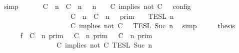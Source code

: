 \begin{isabellebody}
\ simp\isanewline
\ \ \isamarkupfalse%
\ \isamarkupfalse%
\ {\isacartoucheopen}{\isasymlbrakk}\ {\isacharparenleft}{\isacharparenleft}C\ {\isasymUp}\ n{\isacharparenright}\ {\isacharhash}\ {\isacharparenleft}C\ {\isasymnot}{\isasymUp}\ n{\isacharparenright}\ {\isacharhash}\ {\isasymGamma}{\isacharparenright}{\isacharcomma}\ n\ {\isasymturnstile}\ {\isasymPsi}\ {\isasymtriangleright}\ {\isacharparenleft}{\isacharparenleft}C\ implies\ not\ C\ {\isacharhash}\ {\isasymPhi}{\isacharparenright}\ {\isasymrbrakk}\isactrlsub c\isactrlsub o\isactrlsub n\isactrlsub f\isactrlsub i\isactrlsub g\isanewline
\ \ \ \ \ \ \ \ \ \ \ \ \ \ \ \ \ \ {\isacharequal}\ {\isasymlbrakk}{\isasymlbrakk}\ {\isacharparenleft}{\isacharparenleft}C\ {\isasymUp}\ n{\isacharparenright}\ {\isacharhash}\ {\isacharparenleft}C\ {\isasymnot}{\isasymUp}\ n{\isacharparenright}\ {\isacharhash}\ {\isasymGamma}{\isacharparenright}\ {\isasymrbrakk}{\isasymrbrakk}\isactrlsub p\isactrlsub r\isactrlsub i\isactrlsub m\ {\isasyminter}\ {\isasymlbrakk}{\isasymlbrakk}\ {\isasymPsi}\ {\isasymrbrakk}{\isasymrbrakk}\isactrlsub T\isactrlsub E\isactrlsub S\isactrlsub L\isactrlbsup {\isasymge}\ n\isactrlesup \isanewline
\ \ \ \ \ \ \ \ \ \ \ \ \ \ \ \ \ \ {\isasyminter}\ {\isasymlbrakk}{\isasymlbrakk}\ {\isacharparenleft}C\ implies\ not\ C\ {\isacharhash}\ {\isasymPhi}\ {\isasymrbrakk}{\isasymrbrakk}\isactrlsub T\isactrlsub E\isactrlsub S\isactrlsub L\isactrlbsup {\isasymge}\ Suc\ n\isactrlesup {\isacartoucheclose}\ \isamarkupfalse%
\ simp\isanewline
\ \ \isamarkupfalse%
\ \isamarkupfalse%
\ {\isacharquery}thesis\isanewline
\ \ \isamarkupfalse%
\ {\isacharminus}\isanewline
\ \ \ \ \isamarkupfalse%
\ f{}{\isacharcolon}\ {\isacartoucheopen}{\isacharparenleft}{\isasymlbrakk}\ C\ {\isasymnot}{\isasymUp}\ n\ {\isasymrbrakk}\isactrlsub p\isactrlsub r\isactrlsub i\isactrlsub m\ {\isasymunion}\ {\isasymlbrakk}\ C\ {\isasymUp}\ n\ {\isasymrbrakk}\isactrlsub p\isactrlsub r\isactrlsub i\isactrlsub m\ {\isasyminter}\ {\isasymlbrakk}\ C\ {\isasymnot}{\isasymUp}\ n\ {\isasymrbrakk}\isactrlsub p\isactrlsub r\isactrlsub i\isactrlsub m{\isacharparenright}\isanewline
\ \ \ \ \ \ \ \ \ \ \ \ \ \ {\isasyminter}\ {\isasymlbrakk}\ C\ implies\ not\ C\ {\isasymrbrakk}\isactrlsub T\isactrlsub E\isactrlsub S\isactrlsub L\isactrlbsup {\isasymge}\ Suc\ n\isactrlesup \isanewline

\end{isabellebody}
